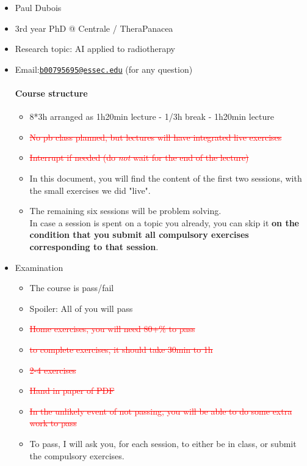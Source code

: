 \documentclass[a4paper,12pt]{article}
\providecommand{\tightlist}{\setlength{\itemsep}{0pt}\setlength{\parskip}{0pt}}
\begin{document}
	\begin{itemize}
		\tightlist
		\item Paul Dubois
		\item 3rd year PhD @ Centrale / TheraPanacea
		\item Research topic: AI applied to radiotherapy
		\item Email:\href{mailto:b00795695@essec.edu}{\nolinkurl{b00795695@essec.edu}} (for any question)
		\paragraph{Course structure}
		\begin{itemize}
			\item 8*3h arranged as 1h20min lecture - 1/3h break - 1h20min lecture
			\item \textcolor{red}{\st{No pb class planned, but lectures will have integrated live
					exercises}}
			\item \textcolor{red}{\st{Interrupt if needed (do \emph{not} wait for the end of the lecture)}}
			\item In this document, you will find the content of the first two sessions, with the small exercises we did "live".
			\item The remaining six sessions will be problem solving.\\
			In case a session is spent on a topic you already, you can skip it \textbf{on the condition that you submit all compulsory exercises corresponding to that session}.
		\end{itemize}
		\item Examination
		\begin{itemize}
			\tightlist
			\item The course is pass/fail
			\item Spoiler: All of you will pass
			\item \textcolor{red}{\st{Home exercises, you will need 80+\% to pass}}
			\item \textcolor{red}{\st{to complete exercises, it should take 30min to
			1h}}
			\item \textcolor{red}{\st{2-4 exercises}}
			\item \textcolor{red}{\st{Hand in paper of PDF}}
			\item \textcolor{red}{\st{In the unlikely event of not passing, you will be able to do some
			extra work to pass}}
			\item To pass, I will ask you, for each session, to either be in class, or submit the compulsory exercises.

\end{itemize}
\end{itemize}
\end{document}
